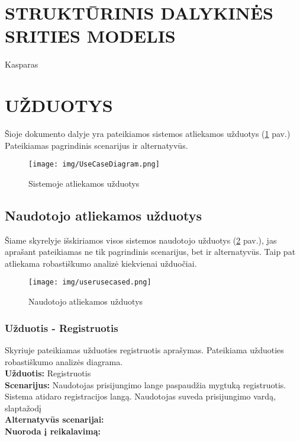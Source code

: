 \documentclass{VUMIFPSkursinis}
\begin{document}
\newpage
\section{STRUKTŪRINIS DALYKINĖS SRITIES MODELIS}
Kasparas
\newpage
\section{UŽDUOTYS}
Šioje dokumento dalyje yra pateikiamos sistemos atliekamos užduotys  (\ref{fig:usecase} pav.) Pateikiamas pagrindinis scenarijus ir alternatyvūs.\\
\begin{figure}[H]
\centering
\texttt{[image: img/UseCaseDiagram.png]}
\label{fig:usecase}
\caption{Sistemoje atliekamos užduotys}
\end{figure}

\subsection{Naudotojo atliekamos užduotys}
Šiame skyrelyje išskiriamos visos sistemos naudotojo užduotys (\ref{fig:usercd} pav.), jas aprašant pateikiamas ne tik pagrindinis scenarijus, bet ir alternatyvūs. Taip pat atliekama robastiškumo analizė kiekvienai užduočiai.

\begin{figure}[H]
\centering
\texttt{[image: img/userusecased.png]}
\label{fig:usercd}
\caption{Naudotojo atliekamos užduotys}
\end{figure}

\subsubsection{Užduotis - Registruotis}
Skyriuje pateikiamas užduoties registruotis aprašymas. Pateikiama užduoties robastiškumo analizės diagrama.\\
\textbf{Užduotis:}  Registruotis \\
\textbf{Scenarijus:} Naudotojas prisijungimo lange paspaudžia mygtuką registruotis. Sistema atidaro registracijos langą. Naudotojas suveda prisijungimo vardą, slaptažodį  \\
\textbf{Alternatyvūs scenarijai:} \\
\textbf{Nuoroda į reikalavimą: } 


\newpage

\end{document}
